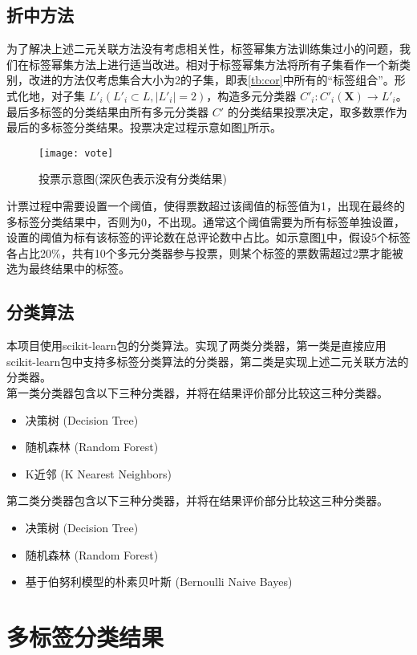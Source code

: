\documentclass[a4paper, twocolumn]{article}
\begin{document}
\begin{CJK}{UTF8}{gbsn}
	\subsection{折中方法}
	为了解决上述二元关联方法没有考虑相关性，标签幂集方法训练集过小的问题，我们在标签幂集方法上进行适当改进。相对于标签幂集方法将所有子集看作一个新类别，改进的方法仅考虑集合大小为2的子集，即表\ref{tb:cor}中所有的“标签组合”。形式化地，对子集 $ L'_i   (L'_i \subset L, |L'_i| = 2) $，构造多元分类器 $ C'_i : C'_i(\textbf{X}) \rightarrow L'_i $。\\
	最后多标签的分类结果由所有多元分类器 $ C' $ 的分类结果投票决定，取多数票作为最后的多标签分类结果。投票决定过程示意如图\ref{fig:vote}所示。
	\begin{figure}[h]
	\centering
	\texttt{[image: vote]}
	\caption{投票示意图(深灰色表示没有分类结果)}
	\label{fig:vote}
	\end{figure}
	\newline
	计票过程中需要设置一个阈值，使得票数超过该阈值的标签值为1，出现在最终的多标签分类结果中，否则为0，不出现。通常这个阈值需要为所有标签单独设置，设置的阈值为标有该标签的评论数在总评论数中占比。如示意图\ref{fig:vote}中，假设5个标签各占比20\%，共有10个多元分类器参与投票，则某个标签的票数需超过2票才能被选为最终结果中的标签。
	\subsection{分类算法}
	本项目使用scikit-learn包的分类算法。实现了两类分类器，第一类是直接应用scikit-learn包中支持多标签分类算法的分类器\cite{sk_multilabel}，第二类是实现上述二元关联方法的分类器。\\
	第一类分类器包含以下三种分类器，并将在结果评价部分比较这三种分类器。
	\begin{itemize}
		\item 决策树 (Decision Tree)
		\item 随机森林 (Random Forest)
		\item K近邻 (K Nearest Neighbors)
	\end{itemize}
	第二类分类器包含以下三种分类器，并将在结果评价部分比较这三种分类器。
	\begin{itemize}
		\item 决策树 (Decision Tree)
		\item 随机森林 (Random Forest)
		\item 基于伯努利模型的朴素贝叶斯 (Bernoulli Naive Bayes)
	\end{itemize}
	\section{多标签分类结果}

\end{CJK}
\end{document}
